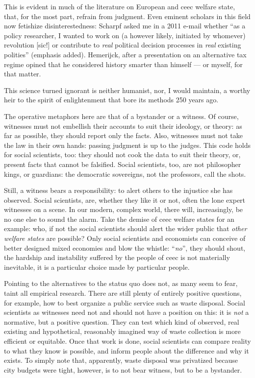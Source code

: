 This is evident in much of the literature on European and \gls{ceec} welfare state, that, for the most part, refrain from judgment.
Even eminent scholars in this field now fetishize disinterestedness:
Scharpf asked me in a 2011 e-mail whether ``as a policy researcher, I wanted to work on (a however likely, initiated by whomever) revolution [sic!] or contribute to \emph{real} political decision processes in \emph{real} existing polities'' (emphasis added).
Hemerijck, after a presentation on an alternative tax regime opined that he considered history smarter than himself --- or myself, for that matter.

This science turned ignorant is neither humanist, nor, I would maintain, a worthy heir to the spirit of enlightenment that bore its methods 250 years ago.

The operative metaphors here are that of a bystander or a witness.
Of course, witnesses must not embellish their accounts to suit their ideology, or theory:
as far as possible, they should report only the facts.
Also, witnesses must not take the law in their own hands:
passing judgment is up to the judges.
This code holds for social scientists, too:
they should not cook the data to suit their theory, or, present facts that cannot be falsified.
Social scientists, too, are not philosopher kings, or guardians:
the democratic sovereigns, not the professors, call the shots.

Still, a witness bears a responsibility:
to alert others to the injustice she has observed.
Social scientists, are, whether they like it or not, often the lone expert witnesses on a scene.
In our modern, complex world, there will, increasingly, be no one else to sound the alarm.
Take the demise of \gls{ceec} welfare states for an example:
who, if not the social scientists should alert the wider public that \emph{other welfare states} are possible?
Only social scientists and economists can conceive of better designed mixed economies and blow the whistle:
``\emph{no}'', they should shout, the hardship and instability suffered by the people of \gls{ceec} is not materially inevitable, it is a particular choice made by particular people.

Pointing to the alternatives to the status quo does not, as many seem to fear, taint all empirical research.
There are still plenty of entirely positive questions, for example, how to best organize a public service such as waste disposal.
Social scientists as witnesses need not and should not have a position on this:
it is \emph{not} a normative, but a positive question.
They can test which kind of observed, real existing and hypothetical, reasonably imagined way of waste collection is more efficient or equitable.
Once that work is done, social scientists can compare reality to what they know is possible, and inform people about the difference and why it exists.
To simply note that, apparently, waste disposal was privatized because city budgets were tight, however, is to not bear witness, but to be a bystander.

